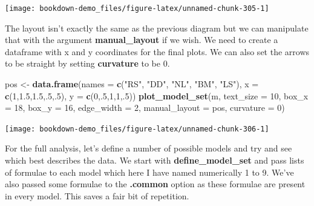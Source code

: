 \documentclass[
]{book}
\newenvironment{Shaded}{\begin{snugshade}}{\end{snugshade}}
\newcommand{\DataTypeTok}[1]{\textcolor[rgb]{0.13,0.29,0.53}{#1}}
\newcommand{\DecValTok}[1]{\textcolor[rgb]{0.00,0.00,0.81}{#1}}
\newcommand{\FloatTok}[1]{\textcolor[rgb]{0.00,0.00,0.81}{#1}}
\newcommand{\KeywordTok}[1]{\textcolor[rgb]{0.13,0.29,0.53}{\textbf{#1}}}
\newcommand{\NormalTok}[1]{#1}
\newcommand{\StringTok}[1]{\textcolor[rgb]{0.31,0.60,0.02}{#1}}
\begin{document}
\begin{center}\texttt{[image: bookdown-demo\_files/figure-latex/unnamed-chunk-305-1]} \end{center}

The layout isn't exactly the same as the previous diagram but we can manipulate that with the argument \textbf{manual\_layout} if we wish. We need to create a dataframe with x and y coordinates for the final plots. We can also set the arrows to be straight by setting \textbf{curvature} to be 0.

\begin{Shaded}
\begin{Highlighting}[]
\NormalTok{pos \textless{}{-}}\StringTok{ }\KeywordTok{data.frame}\NormalTok{(}\DataTypeTok{names =} \KeywordTok{c}\NormalTok{(}\StringTok{"RS"}\NormalTok{, }\StringTok{"DD"}\NormalTok{, }\StringTok{"NL"}\NormalTok{, }\StringTok{"BM"}\NormalTok{, }\StringTok{"LS"}\NormalTok{),}
                  \DataTypeTok{x =} \KeywordTok{c}\NormalTok{(}\DecValTok{1}\NormalTok{,}\FloatTok{1.5}\NormalTok{,}\FloatTok{1.5}\NormalTok{,.}\DecValTok{5}\NormalTok{,.}\DecValTok{5}\NormalTok{),}
                  \DataTypeTok{y =} \KeywordTok{c}\NormalTok{(}\DecValTok{0}\NormalTok{,.}\DecValTok{5}\NormalTok{,}\DecValTok{1}\NormalTok{,}\DecValTok{1}\NormalTok{,.}\DecValTok{5}\NormalTok{))}
\KeywordTok{plot\_model\_set}\NormalTok{(m, }\DataTypeTok{text\_size =} \DecValTok{10}\NormalTok{, }\DataTypeTok{box\_x =} \DecValTok{18}\NormalTok{, }\DataTypeTok{box\_y =} \DecValTok{16}\NormalTok{,}
               \DataTypeTok{edge\_width =} \DecValTok{2}\NormalTok{, }\DataTypeTok{manual\_layout =}\NormalTok{ pos, }\DataTypeTok{curvature =} \DecValTok{0}\NormalTok{)}
\end{Highlighting}
\end{Shaded}

\begin{center}\texttt{[image: bookdown-demo\_files/figure-latex/unnamed-chunk-306-1]} \end{center}

For the full analysis, let's define a number of possible models and try and see which best describes the data. We start with \textbf{define\_model\_set} and pass lists of formulae to each model which here I have named numerically 1 to 9. We've also passed some formulae to the \textbf{.common} option as these formulae are present in every model. This saves a fair bit of repetition.
\end{document}
